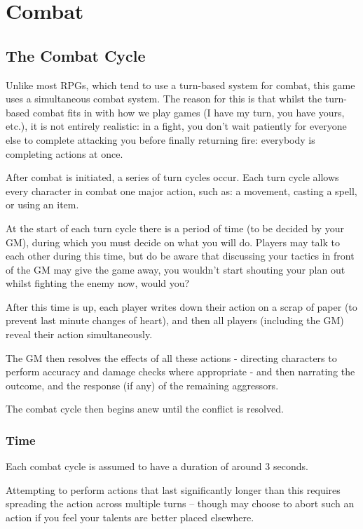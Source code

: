 
\chapter{Combat}

\section{The Combat Cycle}
Unlike most RPGs, which tend to use a turn-based system for combat, this game uses a simultaneous combat system. The reason for this is that whilst the turn-based combat fits in with how we play games (I have my turn, you have yours, etc.), it is not entirely realistic: in a fight, you don't wait patiently for everyone else to complete attacking you before finally returning fire: everybody is completing actions at once. 

After combat is initiated, a series of turn cycles occur. Each turn cycle allows every character in combat one major action, such as: a movement, casting a spell, or using an item. 

At the start of each turn cycle there is a period of time (to be decided by your GM), during which you must decide on what you will do. Players may talk to each other during this time, but do be aware that discussing your tactics in front of the GM may give the game away, you wouldn't start shouting your plan out whilst fighting the enemy now, would you? 

After this time is up, each player writes down their action on a scrap of paper (to prevent last minute changes of heart), and then all players (including the GM) reveal their action simultaneously. 

The GM then resolves the effects of all these actions - directing characters to perform accuracy and damage checks where appropriate - and then narrating the outcome, and the response (if any) of the remaining aggressors. 

The combat cycle then begins anew until the conflict is resolved. 

\subsection{Time}

Each combat cycle is assumed to have a duration of around 3 seconds. 

Attempting to perform actions that last significantly longer than this requires spreading the action across multiple turns -- though may choose to abort such an action if you feel your talents are better placed elsewhere. 

